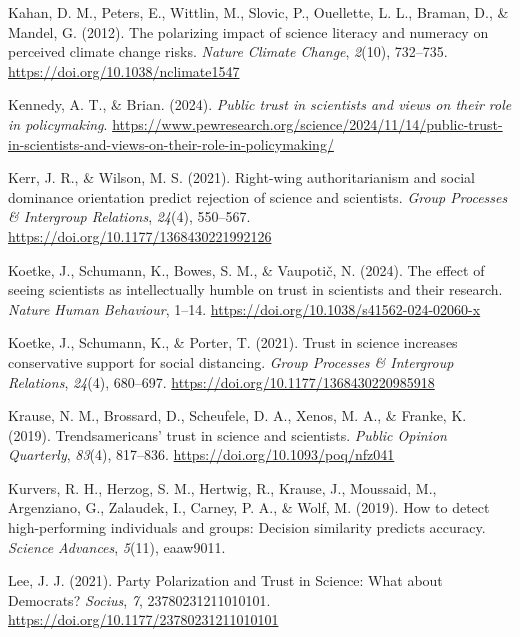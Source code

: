 \documentclass[
  jou,
  floatsintext,
  longtable,
  nolmodern,
  notxfonts,
  notimes,
  colorlinks=true,linkcolor=blue,citecolor=blue,urlcolor=blue]{apa7}
\newlength{\cslhangindent}
\newenvironment{CSLReferences}[2] %
 {\begin{list}{}{%
  \setlength{\itemindent}{0pt}
  \setlength{\leftmargin}{0pt}
  \setlength{\parsep}{0pt}
  \ifodd #1
   \setlength{\leftmargin}{\cslhangindent}
   \setlength{\itemindent}{-1\cslhangindent}
  \fi
  \setlength{\itemsep}{#2\baselineskip}}}
 {\end{list}}
\begin{document}
\begin{CSLReferences}{1}{0}
Kahan, D. M., Peters, E., Wittlin, M., Slovic, P., Ouellette, L. L.,
Braman, D., \& Mandel, G. (2012). The polarizing impact of science
literacy and numeracy on perceived climate change risks. \emph{Nature
Climate Change}, \emph{2}(10), 732--735.
\url{https://doi.org/10.1038/nclimate1547}

Kennedy, A. T., \& Brian. (2024). \emph{Public trust in scientists and
views on their role in policymaking}.
\url{https://www.pewresearch.org/science/2024/11/14/public-trust-in-scientists-and-views-on-their-role-in-policymaking/}

Kerr, J. R., \& Wilson, M. S. (2021). Right-wing authoritarianism and
social dominance orientation predict rejection of science and
scientists. \emph{Group Processes \& Intergroup Relations},
\emph{24}(4), 550--567. \url{https://doi.org/10.1177/1368430221992126}

Koetke, J., Schumann, K., Bowes, S. M., \& Vaupotič, N. (2024). The
effect of seeing scientists as intellectually humble on trust in
scientists and their research. \emph{Nature Human Behaviour}, 1--14.
\url{https://doi.org/10.1038/s41562-024-02060-x}

Koetke, J., Schumann, K., \& Porter, T. (2021). Trust in science
increases conservative support for social distancing. \emph{Group
Processes \& Intergroup Relations}, \emph{24}(4), 680--697.
\url{https://doi.org/10.1177/1368430220985918}

Krause, N. M., Brossard, D., Scheufele, D. A., Xenos, M. A., \& Franke,
K. (2019). Trends{\textemdash}americans{'} trust in science and
scientists. \emph{Public Opinion Quarterly}, \emph{83}(4), 817--836.
\url{https://doi.org/10.1093/poq/nfz041}

Kurvers, R. H., Herzog, S. M., Hertwig, R., Krause, J., Moussaid, M.,
Argenziano, G., Zalaudek, I., Carney, P. A., \& Wolf, M. (2019). How to
detect high-performing individuals and groups: Decision similarity
predicts accuracy. \emph{Science Advances}, \emph{5}(11), eaaw9011.

Lee, J. J. (2021). Party Polarization and Trust in Science: What about
Democrats? \emph{Socius}, \emph{7}, 23780231211010101.
\url{https://doi.org/10.1177/23780231211010101}


\end{CSLReferences}
\end{document}
